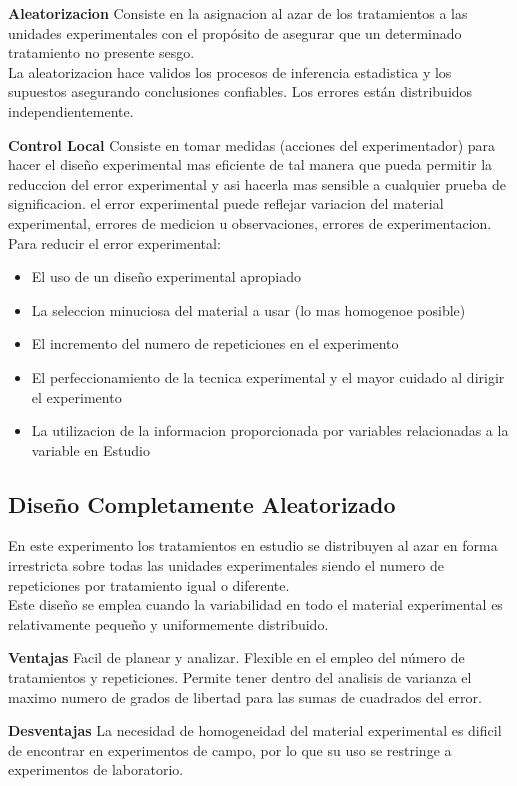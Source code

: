 \documentclass[10pt,a4paper]{article}
\begin{document}
\textbf{Aleatorizacion} Consiste en la asignacion al azar de los tratamientos a las unidades experimentales con el propósito de asegurar que un determinado tratamiento no presente sesgo.\\

La aleatorizacion hace validos los procesos de inferencia estadistica y los supuestos asegurando conclusiones confiables. Los errores están distribuidos independientemente.

\textbf{Control Local} Consiste en tomar medidas (acciones del experimentador) para hacer el diseño experimental mas eficiente de tal manera que pueda permitir la reduccion del error experimental y asi hacerla mas sensible a cualquier prueba de significacion. el error experimental puede reflejar variacion del material experimental, errores de medicion u observaciones, errores de experimentacion.
Para reducir el error experimental:
\begin{itemize}
	\item El uso de un diseño experimental  apropiado
	\item La seleccion minuciosa del material a usar (lo mas homogenoe posible)
	\item El incremento del numero de repeticiones en el experimento
	\item El perfeccionamiento de la tecnica experimental y el mayor cuidado al dirigir el experimento
	\item La utilizacion de la informacion proporcionada por variables relacionadas a la variable en Estudio
\end{itemize}

\subsection{Diseño Completamente Aleatorizado}
En este experimento los tratamientos en estudio se distribuyen al azar en forma irrestricta sobre todas las unidades experimentales siendo el numero de repeticiones por tratamiento igual o diferente.\\
Este diseño se emplea cuando la variabilidad en todo el material experimental es relativamente pequeño y uniformemente distribuido.

\textbf{Ventajas} Facil de planear y analizar. Flexible en el empleo del número de tratamientos y repeticiones. Permite tener dentro del analisis de varianza el maximo numero de grados de libertad para las sumas de cuadrados del error.

\textbf{Desventajas} La necesidad de homogeneidad del material experimental es dificil de encontrar en experimentos de campo, por lo que su uso se restringe a experimentos de laboratorio.
\end{document}
